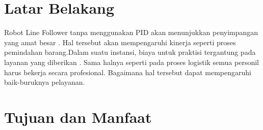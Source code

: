 \section{Latar Belakang}
\par Robot Line Follower tanpa menggunakan PID akan menunjukkan penyimpangan yang amat besar \cite{nath2013implementation}. Hal tersebut akan mempengaruhi kinerja seperti proses pemindahan barang.Dalam suatu instansi, biaya untuk praktisi tergantung pada layanan yang diberikan \cite{punetha2013development}. Sama halnya seperti pada proses logistik semua personil harus bekerja secara profesional. Bagaimana hal tersebut dapat mempengaruhi baik-buruknya pelayanan.
\section{Tujuan dan Manfaat}

